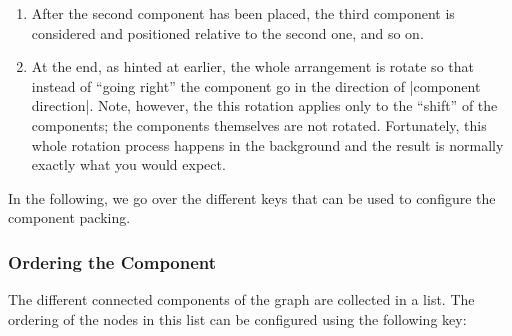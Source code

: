 {\begin{enumerate}
  So, we now wish to place the second component to the right of the
  first component. The component is first shifted vertically according
  to some alignment strategy. For instance, it can be shifted so that
  the topmost node of the first component and the topmost node of the
  second component have the same vertical position. Alternatively, we
  might require that certain ``alignment nodes'' in both components
  have the same vertical position. There are several other strategies,
  which can be configured using the |component align| key.

  One the vertical position has been fixed, the horizontal position is
  computed. Here, two different strategies are available: First, image
  rectangular bounding boxed to be drawn around both components. Then
  we shift the second component such that the right border of the
  bounding box of the first component touches the left border of the
  bounding box of the second component. Instead of having the bounding
  boxes ``touch,'' we can also have a padding of |component sep|
  between them. The second strategy is more involved and also known as
  a ``skyline'' strategy, where (roughly) the components are ``moved together as
  near as possible so that nodes do not touch''. 
\item
  After the second component has been placed, the third component is
  considered and positioned relative to the second one, and so on.
\item
  At the end, as hinted at earlier, the whole arrangement is rotate so
  that instead of ``going right'' the component go in the direction of
  |component direction|. Note, however, the this rotation applies only
  to the ``shift'' of the components; the components themselves are
  not rotated. Fortunately, this whole rotation process happens in the
  background and the result is normally exactly what you would expect.
\end{enumerate}

In the following, we go over the different keys that can be used to
configure the component packing.


\subsubsection{Ordering the Component}

The different connected components of the graph are collected in a
list. The ordering of the nodes in this list can be configured using
the following key:

}

